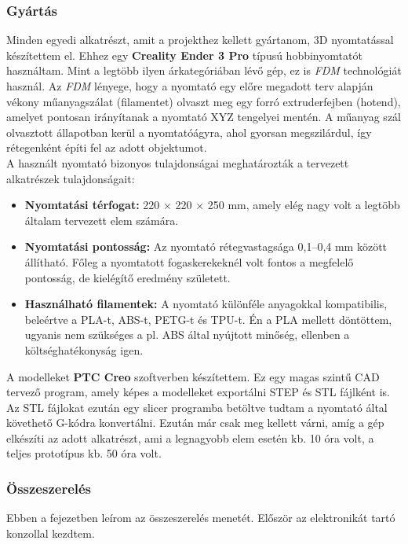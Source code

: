 \documentclass[12pt,a4paper]{article}
\begin{document}
\subsubsection{Gyártás}

Minden egyedi alkatrészt, amit a projekthez kellett gyártanom, 3D nyomtatással készítettem el. Ehhez egy \textbf{Creality Ender 3 Pro} típusú hobbinyomtatót használtam. Mint a legtöbb ilyen árkategóriában lévő gép, ez is \textsl{FDM} technológiát használ. Az \textsl{FDM} lényege, hogy a nyomtató egy előre megadott terv alapján vékony műanyagszálat (filamentet) olvaszt meg egy forró extruderfejben (hotend), amelyet pontosan irányítanak a nyomtató XYZ tengelyei mentén. A műanyag szál olvasztott állapotban kerül a nyomtatóágyra, ahol gyorsan megszilárdul, így rétegenként építi fel az adott objektumot.\\

A használt nyomtató bizonyos tulajdonságai meghatározták a tervezett alkatrészek tulajdonságait:

\begin{itemize}
	\item \textbf{Nyomtatási térfogat:} 220 × 220 × 250 mm, amely elég nagy volt a legtöbb általam tervezett elem számára.
	\item \textbf{Nyomtatási pontosság:} Az nyomtató rétegvastagsága 0,1–0,4 mm között állítható. Főleg a nyomtatott fogaskerekeknél volt fontos a megfelelő pontosság, de kielégítő eredmény született.
	\item \textbf{Használható filamentek:} A nyomtató különféle anyagokkal kompatibilis, beleértve a PLA-t, ABS-t, PETG-t és TPU-t. Én a PLA mellett döntöttem, ugyanis nem szükséges a pl. ABS által nyújtott minőség, ellenben a költséghatékonyság igen.
\end{itemize}

A modelleket \textbf{PTC Creo} szoftverben készítettem. Ez egy magas szintű CAD tervező program, amely képes a modelleket exportálni STEP és STL fájlként is. Az STL fájlokat ezután egy slicer programba betöltve tudtam a nyomtató által követhető G-kódra konvertálni. Ezután már csak meg kellett várni, amíg a gép elkészíti az adott alkatrészt, ami a legnagyobb elem esetén kb. 10 óra volt, a teljes prototípus kb. 50 óra volt.

\pagebreak
\subsubsection{Összeszerelés}

Ebben a fejezetben leírom az összeszerelés menetét. Először az elektronikát tartó konzollal kezdtem.
\end{document}
